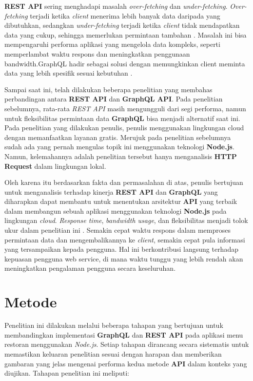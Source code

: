 \documentclass[
 manuscript=article,  %
  layout=publish, 
  year=2024, 
  month= Februari, %
  volume=8,
  number=1 
]{JIKO}
\begin{document}
\textbf{REST API} sering menghadapi masalah \textit{over-fetching} dan \textit{under-fetching}. \textit{Over-fetching} terjadi ketika \textit{client} menerima lebih banyak data daripada yang dibutuhkan, sedangkan \textit{under-fetching} terjadi ketika \textit{client} tidak mendapatkan data yang cukup, sehingga memerlukan permintaan tambahan \cite{3}. Masalah ini bisa mempengaruhi performa aplikasi yang mengelola data kompleks, seperti memperlambat waktu respons dan meningkatkan penggunaan bandwidth.GraphQL hadir sebagai solusi dengan memungkinkan client meminta data yang lebih spesifik sesuai kebutuhan \cite{4}.

Sampai saat ini, telah dilakukan beberapa penelitian yang membahas perbandingan antara \textbf{REST API} dan \textbf{GraphQL API}. Pada penelitian sebelumnya, rata-rata \textit{REST API} masih mengungguli dari segi performa, namun untuk fleksibilitas permintaan data \textbf{GraphQL} bisa menjadi alternatif saat ini. Pada penelitian yang dilakukan penulis, penulis menggunakan lingkungan cloud dengan memanfaatkan layanan gratis. Merujuk pada penelitian sebelumnya sudah ada yang pernah mengulas topik ini menggunakan teknologi \textbf{Node.js}. Namun, kelemahannya adalah penelitian tersebut hanya menganalisis \textbf{HTTP Request} dalam lingkungan lokal.

Oleh karena itu berdasarkan fakta dan permasalahan di atas, penulis bertujuan untuk menganalisis terhadap kinerja \textbf{REST API} dan \textbf{GraphQL} yang diharapkan dapat membantu untuk menentukan arsitektur \textbf{API} yang terbaik dalam membangun sebuah aplikasi menggunakan teknologi \textbf{Node.js} pada lingkungan \textit{cloud}. \textit{Response time}, \textit{bandwidth usage}, dan fleksibilitas menjadi tolok ukur dalam penelitian ini \cite{5}. Semakin cepat waktu respons dalam memproses permintaan data dan mengembalikannya ke \textit{client}, semakin cepat pula informasi yang tersampaikan kepada pengguna. Hal ini berkontribusi langsung terhadap kepuasan pengguna web service, di mana waktu tunggu yang lebih rendah akan meningkatkan pengalaman pengguna secara keseluruhan.

\section{Metode}

Penelitian ini dilakukan melalui beberapa tahapan yang bertujuan untuk membandingkan implementasi \textbf{GraphQL} dan \textbf{REST API} pada aplikasi menu restoran menggunakan \textit{Node.js}. Setiap tahapan dirancang secara sistematis untuk memastikan keluaran penelitian sesuai dengan harapan dan memberikan gambaran yang jelas mengenai performa kedua metode \textbf{API} dalam konteks yang diujikan. Tahapan penelitian ini meliputi:
\end{document}
